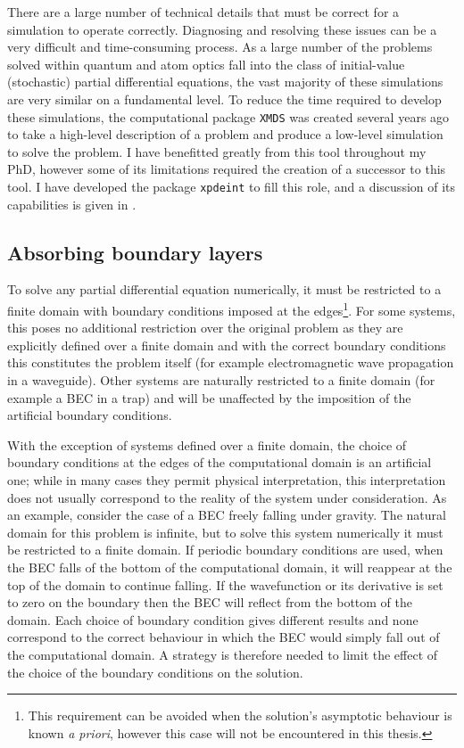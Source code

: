 There are a large number of technical details that must be correct for a simulation to operate correctly.  Diagnosing and resolving these issues can be a very difficult and time-consuming process.  As a large number of the problems solved within quantum and atom optics fall into the class of initial-value (stochastic) partial differential equations, the vast majority of these simulations are very similar on a fundamental level.  To reduce the time required to develop these simulations, the computational package \texttt{XMDS} \citep{Collecutt:2001} was created several years ago to take a high-level description of a problem and produce a low-level simulation to solve the problem.  I have benefitted greatly from this tool throughout my PhD, however some of its limitations required the creation of a successor to this tool.  I have developed the package \texttt{xpdeint} to fill this role, and a discussion of its capabilities is given in .

\subsection{Absorbing boundary layers}
\label{BackgroundTheory:AbsorbingBoundaryLayers}

To solve any partial differential equation numerically, it must be restricted to a finite domain with boundary conditions imposed at the edges\footnote{This requirement can be avoided when the solution's asymptotic behaviour is known \emph{a priori}, however this case will not be encountered in this thesis.}. For some systems, this poses no additional restriction over the original problem as they are explicitly defined over a finite domain and with the correct boundary conditions this constitutes the problem itself (for example electromagnetic wave propagation in a waveguide). Other systems are naturally restricted to a finite domain (for example a BEC in a trap) and will be unaffected by the imposition of the artificial boundary conditions. 

With the exception of systems defined over a finite domain, the choice of boundary conditions at the edges of the computational domain is an artificial one; while in many cases they permit physical interpretation, this interpretation does not usually correspond to the reality of the system under consideration. As an example, consider the case of a BEC freely falling under gravity. The natural domain for this problem is infinite, but to solve this system numerically it must be restricted to a finite domain. If periodic boundary conditions are used, when the BEC falls of the bottom of the computational domain, it will reappear at the top of the domain to continue falling. If the wavefunction or its derivative is set to zero on the boundary then the BEC will reflect from the bottom of the domain. Each choice of boundary condition gives different results and none correspond to the correct behaviour in which the BEC would simply fall out of the computational domain. A strategy is therefore needed to limit the effect of the choice of the boundary conditions on the solution.

